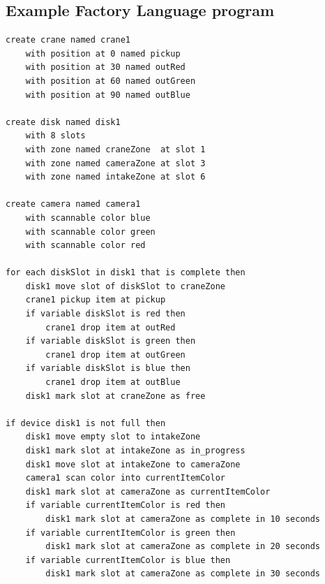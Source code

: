 \subsection{Example Factory Language program}\label{appendix:fl}
\begin{verbatim}
create crane named crane1  
	with position at 0 named pickup 
	with position at 30 named outRed 
	with position at 60 named outGreen 
	with position at 90 named outBlue  

create disk named disk1
	with 8 slots
	with zone named craneZone  at slot 1 
	with zone named cameraZone at slot 3 
	with zone named intakeZone at slot 6 

create camera named camera1  
	with scannable color blue 
	with scannable color green 
	with scannable color red

for each diskSlot in disk1 that is complete then
	disk1 move slot of diskSlot to craneZone
	crane1 pickup item at pickup
	if variable diskSlot is red then  
		crane1 drop item at outRed
	if variable diskSlot is green then  
		crane1 drop item at outGreen
	if variable diskSlot is blue then  
		crane1 drop item at outBlue
	disk1 mark slot at craneZone as free

if device disk1 is not full then  
	disk1 move empty slot to intakeZone
	disk1 mark slot at intakeZone as in_progress 
	disk1 move slot at intakeZone to cameraZone
	camera1 scan color into currentItemColor 
	disk1 mark slot at cameraZone as currentItemColor  
	if variable currentItemColor is red then  
		disk1 mark slot at cameraZone as complete in 10 seconds
	if variable currentItemColor is green then  
		disk1 mark slot at cameraZone as complete in 20 seconds  
	if variable currentItemColor is blue then  
		disk1 mark slot at cameraZone as complete in 30 seconds
\end{verbatim}
